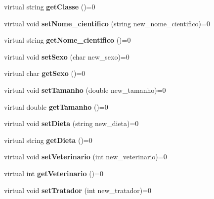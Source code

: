 \begin{DoxyCompactItemize}
virtual string {\bfseries get\+Classe} ()=0
\item 
\mbox{\label{class_animal_afaeab408890548f2091762404ba01612}} 
virtual void {\bfseries set\+Nome\+\_\+cientifico} (string new\+\_\+nome\+\_\+cientifico)=0
\item 
\mbox{\label{class_animal_a59b6af647ac7285a7418cd517b8973cd}} 
virtual string {\bfseries get\+Nome\+\_\+cientifico} ()=0
\item 
\mbox{\label{class_animal_aa1e821d84e957e28c930f7db3603c25b}} 
virtual void {\bfseries set\+Sexo} (char new\+\_\+sexo)=0
\item 
\mbox{\label{class_animal_a05e19f2375e7fb86d07e81c28bbc2684}} 
virtual char {\bfseries get\+Sexo} ()=0
\item 
\mbox{\label{class_animal_ae0720867af5a6a689633ac6588945c37}} 
virtual void {\bfseries set\+Tamanho} (double new\+\_\+tamanho)=0
\item 
\mbox{\label{class_animal_a65036593a9ba938e7c6bf5b6ab9bdd73}} 
virtual double {\bfseries get\+Tamanho} ()=0
\item 
\mbox{\label{class_animal_a6d956932950e5ac90e7d51d9ace8e48e}} 
virtual void {\bfseries set\+Dieta} (string new\+\_\+dieta)=0
\item 
\mbox{\label{class_animal_aa7408813b6535b5a8bb8587461468ba5}} 
virtual string {\bfseries get\+Dieta} ()=0
\item 
\mbox{\label{class_animal_a51d47fb110119f489f27f6754862ed0a}} 
virtual void {\bfseries set\+Veterinario} (int new\+\_\+veterinario)=0
\item 
\mbox{\label{class_animal_a168b267fa36333fe7bd15c83b00e322d}} 
virtual int {\bfseries get\+Veterinario} ()=0
\item 
\mbox{\label{class_animal_a68ef381cfb0cdd489896ec2fa3b0090f}} 
virtual void {\bfseries set\+Tratador} (int new\+\_\+tratador)=0
\item 

\end{DoxyCompactItemize}
